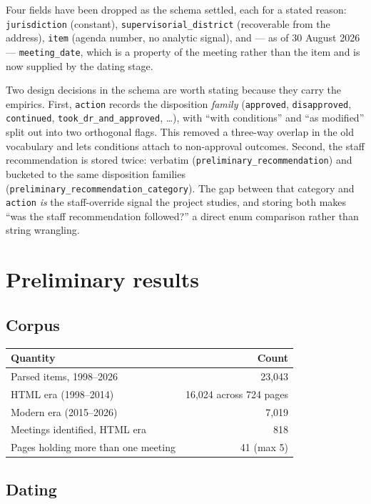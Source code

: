 \documentclass[11pt]{article}
\begin{document}
Four fields have been dropped as the schema settled, each for a stated reason:
\texttt{jurisdiction} (constant), \texttt{supervisorial\_district} (recoverable from the
address), \texttt{item} (agenda number, no analytic signal), and --- as of 30 August 2026
--- \texttt{meeting\_date}, which is a property of the meeting rather than the item and is
now supplied by the dating stage.

Two design decisions in the schema are worth stating because they carry the empirics.
First, \texttt{action} records the disposition \emph{family} (\texttt{approved},
\texttt{disapproved}, \texttt{continued}, \texttt{took\_dr\_and\_approved}, \ldots), with
``with conditions'' and ``as modified'' split out into two orthogonal flags. This removed a
three-way overlap in the old vocabulary and lets conditions attach to non-approval
outcomes. Second, the staff recommendation is stored twice: verbatim
(\texttt{preliminary\_recommendation}) and bucketed to the same disposition families
(\texttt{preliminary\_recommendation\_category}). The gap between that category and
\texttt{action} \emph{is} the staff-override signal the project studies, and storing both
makes ``was the staff recommendation followed?'' a direct enum comparison rather than
string wrangling.

\section{Preliminary results}

\subsection{Corpus}

\begin{table}[h]
\centering
\begin{tabular}{lr}
\toprule
Quantity & Count \\
\midrule
Parsed items, 1998--2026 & 23{,}043 \\
\quad HTML era (1998--2014) & 16{,}024 across 724 pages \\
\quad Modern era (2015--2026) & 7{,}019 \\
Meetings identified, HTML era & 818 \\
Pages holding more than one meeting & 41 (max 5) \\
\bottomrule
\end{tabular}
\end{table}

\subsection{Dating}
\end{document}
